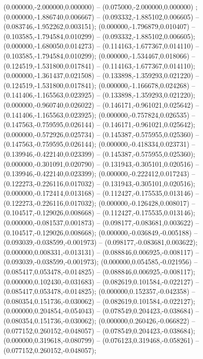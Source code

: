  (0.000000,-2.000000,0.000000) -- (0.075000,-2.000000,0.000000) ;
 (0.000000,-1.886740,0.006667) -- (0.093332,-1.885102,0.006605) -- (0.083746,-1.952262,0.003151);
 (0.000000,-1.796879,0.010407) -- (0.103585,-1.794584,0.010299) -- (0.093332,-1.885102,0.006605);
 (0.000000,-1.680050,0.014273) -- (0.114163,-1.677367,0.014110) -- (0.103585,-1.794584,0.010299);
 (0.000000,-1.534467,0.018066) -- (0.124519,-1.531800,0.017841) -- (0.114163,-1.677367,0.014110);
 (0.000000,-1.361437,0.021508) -- (0.133898,-1.359293,0.021220) -- (0.124519,-1.531800,0.017841);
 (0.000000,-1.166678,0.024268) -- (0.141406,-1.165563,0.023925) -- (0.133898,-1.359293,0.021220);
 (0.000000,-0.960740,0.026022) -- (0.146171,-0.961021,0.025642) -- (0.141406,-1.165563,0.023925);
 (0.000000,-0.757824,0.026535) -- (0.147563,-0.759595,0.026144) -- (0.146171,-0.961021,0.025642);
 (0.000000,-0.572926,0.025734) -- (0.145387,-0.575955,0.025360) -- (0.147563,-0.759595,0.026144);
 (0.000000,-0.418334,0.023731) -- (0.139946,-0.422140,0.023399) -- (0.145387,-0.575955,0.025360);
 (0.000000,-0.301091,0.020790) -- (0.131943,-0.305101,0.020516) -- (0.139946,-0.422140,0.023399);
 (0.000000,-0.222412,0.017243) -- (0.122273,-0.226116,0.017032) -- (0.131943,-0.305101,0.020516);
 (0.000000,-0.172414,0.013168) -- (0.112427,-0.175535,0.013146) -- (0.122273,-0.226116,0.017032);
 (0.000000,-0.126428,0.008017) -- (0.104517,-0.129026,0.008668) -- (0.112427,-0.175535,0.013146);
 (0.000000,-0.081537,0.001873) -- (0.098177,-0.083681,0.003622) -- (0.104517,-0.129026,0.008668);
 (0.000000,-0.036849,-0.005188) -- (0.093039,-0.038599,-0.001973) -- (0.098177,-0.083681,0.003622);
 (0.000000,0.008331,-0.013131) -- (0.088846,0.006925,-0.008117) -- (0.093039,-0.038599,-0.001973);
 (0.000000,0.054585,-0.021956) -- (0.085417,0.053478,-0.014825) -- (0.088846,0.006925,-0.008117);
 (0.000000,0.102430,-0.031683) -- (0.082619,0.101584,-0.022127) -- (0.085417,0.053478,-0.014825);
 (0.000000,0.152357,-0.042358) -- (0.080354,0.151736,-0.030062) -- (0.082619,0.101584,-0.022127);
 (0.000000,0.204854,-0.054043) -- (0.078549,0.204423,-0.038684) -- (0.080354,0.151736,-0.030062);
 (0.000000,0.260426,-0.066822) -- (0.077152,0.260152,-0.048057) -- (0.078549,0.204423,-0.038684);
 (0.000000,0.319618,-0.080799) -- (0.076123,0.319468,-0.058261) -- (0.077152,0.260152,-0.048057);
